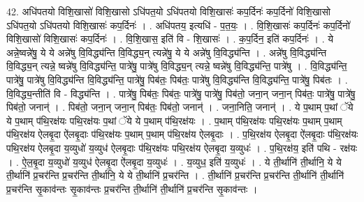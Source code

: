 \documentclass[17pt]{extarticle}
\begin{document}
42. अधि॑पतयो विशि॒खासो॑ विशि॒खासो ऽधि॑पत॒यो ऽधि॑पतयो विशि॒खासः॑ कप॒र्दिनः॑ कप॒र्दिनो॑ विशि॒खासो ऽधि॑पत॒यो ऽधि॑पतयो विशि॒खासः॑ कप॒र्दिनः॑ । . अधि॑पतय॒ इत्यधि॑ - प॒त॒यः॒ । . वि॒शि॒खासः॑ कप॒र्दिनः॑ कप॒र्दिनो॑ विशि॒खासो॑ विशि॒खासः॑ कप॒र्दिनः॑ । . वि॒शि॒खास॒ इति॑ वि - शि॒खासः॑ । . क॒प॒र्दिन॒ इति॑ कप॒र्दिनः॑ । . ये अन्ने॒ष्वन्ने॑षु॒ ये ये अन्ने॑षु वि॒विद्ध्य॑न्ति वि॒विद्ध्य॒न् त्यन्ने॑षु॒ ये ये अन्ने॑षु वि॒विद्ध्य॑न्ति । . अन्ने॑षु वि॒विद्ध्य॑न्ति वि॒विद्ध्य॒न् त्यन्ने॒ ष्वन्ने॑षु वि॒विद्ध्य॑न्ति॒ पात्रे॑षु॒ पात्रे॑षु वि॒विद्ध्य॒न् त्यन्ने॒ ष्वन्ने॑षु वि॒विद्ध्य॑न्ति॒ पात्रे॑षु । . वि॒विद्ध्य॑न्ति॒ पात्रे॑षु॒ पात्रे॑षु वि॒विद्ध्य॑न्ति वि॒विद्ध्य॑न्ति॒ पात्रे॑षु॒ पिब॑तः॒ पिब॑तः॒ पात्रे॑षु वि॒विद्ध्य॑न्ति वि॒विद्ध्य॑न्ति॒ पात्रे॑षु॒ पिब॑तः । . वि॒विद्ध्य॒न्तीति॑ वि - विद्ध्य॑न्ति । . पात्रे॑षु॒ पिब॑तः॒ पिब॑तः॒ पात्रे॑षु॒ पात्रे॑षु॒ पिब॑तो॒ जना॒न् जना॒न् पिब॑तः॒ पात्रे॑षु॒ पात्रे॑षु॒ पिब॑तो॒ जनान्॑ । . पिब॑तो॒ जना॒न् जना॒न् पिब॑तः॒ पिब॑तो॒ जनान्॑ । . जना॒निति॒ जनान्॑ । . ये प॒थाम् प॒थां ॅये ये प॒थाम् प॑थि॒रक्ष॑यः पथि॒रक्ष॑यः प॒थां ॅये ये प॒थाम् प॑थि॒रक्ष॑यः । . प॒थाम् प॑थि॒रक्ष॑यः पथि॒रक्ष॑यः प॒थाम् प॒थाम् प॑थि॒रक्ष॑य ऐलबृ॒दा ऐ॑लबृ॒दाः प॑थि॒रक्ष॑यः प॒थाम् प॒थाम् प॑थि॒रक्ष॑य ऐलबृ॒दाः । . प॒थि॒रक्ष॑य ऐलबृ॒दा ऐ॑लबृ॒दाः प॑थि॒रक्ष॑यः पथि॒रक्ष॑य ऐलबृ॒दा य॒व्युधो॑ य॒व्युध॑ ऐलबृ॒दाः प॑थि॒रक्ष॑यः पथि॒रक्ष॑य ऐलबृ॒दा य॒व्युधः॑ । . प॒थि॒रक्ष॑य॒ इति॑ पथि - रक्ष॑यः । . ऐ॒ल॒बृ॒दा य॒व्युधो॑ य॒व्युध॑ ऐलबृ॒दा ऐ॑लबृ॒दा य॒व्युधः॑ । . य॒व्युध॒ इति॑ य॒व्युधः॑ । . ये ती॒र्थानि॑ ती॒र्थानि॒ ये ये ती॒र्थानि॑ प्र॒चर॑न्ति प्र॒चर॑न्ति ती॒र्थानि॒ ये ये ती॒र्थानि॑ प्र॒चर॑न्ति । . ती॒र्थानि॑ प्र॒चर॑न्ति प्र॒चर॑न्ति ती॒र्थानि॑ ती॒र्थानि॑ प्र॒चर॑न्ति सृ॒काव॑न्तः सृ॒काव॑न्तः प्र॒चर॑न्ति ती॒र्थानि॑ ती॒र्थानि॑ प्र॒चर॑न्ति सृ॒काव॑न्तः । \newline
\pagebreak
{}
\end{document}
